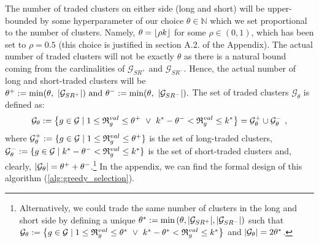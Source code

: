 \mx
The number of traded clusters on either side (long and short) will be upper-bounded by some hyperparameter of our choice $\theta \in \mathbb{N}$
which we set proportional to the number of clusters. Namely, $\theta =\lfloor \rho k \rfloor$ for some $\rho\in(0,1)$, which has been set to $\rho=0.5$ (this choice is justified in section A.2. of the Appendix).
The actual number of traded clusters will not be exactly $\theta$ as there is a natural bound coming from the cardinalities of $\mathcal G_{SR^+}$ and $\mathcal G_{SR^-}$. Hence, the actual number of long and short-traded clusters will be
$
\theta^+ := \min(\theta, ~|\mathcal G_{SR^+}|)
~\text{and}~
\theta^- := \min(\theta, ~|\mathcal G_{SR^-}|)
.
$
%
The set of traded clusters $\mathcal G_{\theta}$ is defined as:
$$
\mathcal{G}_\theta := 
\left\{
g \in \mathcal G 
\mid 
1\leq \mathfrak{R}_g^{val} \leq \theta^+
~\vee~ 
k^* -\theta^- < \mathfrak{R}_g^{val} \leq k^*
\right\} 
= 
\mathcal{G}_{\theta}^+ \cup \mathcal{G}_{\theta}^-
~,
$$
where
$
\mathcal{G}_{\theta}^+ := 
\{ g \in\mathcal{G} \mid 
1\leq \mathfrak{R}_g^{val} \leq \theta^+
\}
$
is the set of long-traded clusters,
$
\mathcal{G}_{\theta}^- := 
\{ g \in\mathcal{G} \mid 
k^*-\theta^-
< \mathfrak{R}_g^{val} \leq 
k^*
\}
$
is the set of short-traded clusters 
and, clearly, $\left|\mathcal{G}_{\theta}\right|=\theta^+ + \theta^- $.\footnote{
Alternatively, we could trade the same number of clusters in the long and short side by defining a unique 
$
\theta^* := \min\left(\theta, |\mathcal G_{SR^+}|, |\mathcal G_{SR^-}| \right)
$
such that
$
\mathcal{G}_\theta := 
\left\{
g \in \mathcal G 
\mid 
1\leq \mathfrak{R}_g^{val} \leq \theta^*
~\vee~ 
k^*-\theta^* < \mathfrak{R}_g^{val} \leq k^*
\right\} 
$
and 
$\left|\mathcal{G}_\theta\right|=2\theta^*$.
}
In the appendix, we can find the formal design of this algorithm (\cref{alg:greedy_selection}).


